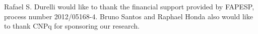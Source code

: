 Rafael S. Durelli would like to thank the financial support provided by FAPESP, process number 2012/05168-4. Bruno Santos and Raphael Honda also would like to thank CNPq for sponsoring our research.